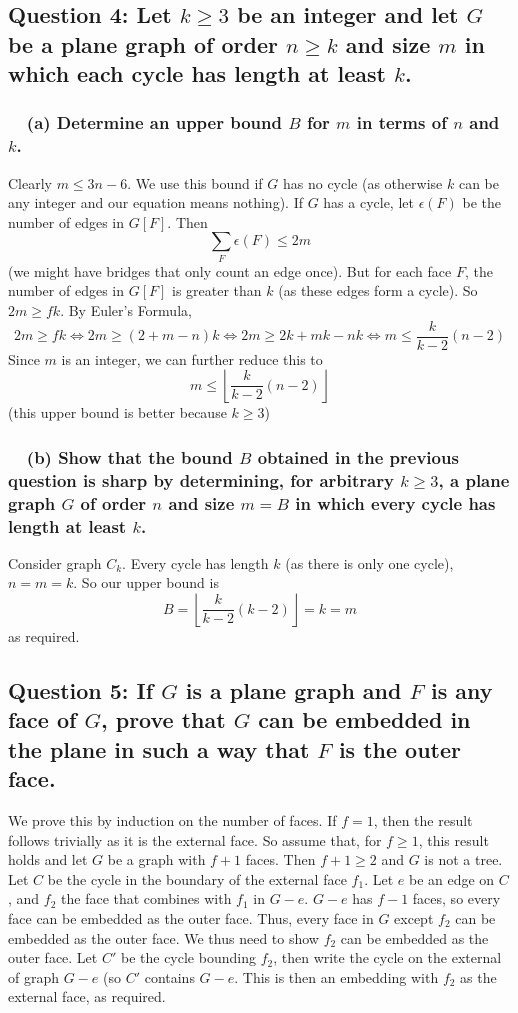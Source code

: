 \documentclass[letterpaper, 11pt]{article}
\newcommand{\1}{\mathds{1}}	%
\theoremstyle{definition}
\begin{document}
\subsection*{Question 4: Let $k \ge 3$ be an integer and let $G$ be a plane graph of order $n \ge k$ and size $m$ in which each cycle has length at least $k$.}

\subsubsection*{\ \ (a) Determine an upper bound $B$ for $m$ in terms of $n$ and $k$.}
Clearly $m \le 3n-6$. We use this bound if $G$ has no cycle (as otherwise $k$ can be any integer and our equation means nothing). If $G$ has a cycle, let $\epsilon (F)$ be the number of edges in $G[F]$. Then\[
\sum _F \epsilon (F) \le 2m
\]
(we might have bridges that only count an edge once). But for each face $F$, the number of edges in $G[F]$ is greater than $k$ (as these edges form a cycle). So $2m \ge fk$. By Euler's Formula, \[
2m \ge fk \iff 2m \ge (2 + m - n)k \iff 2m \ge 2k + mk - nk \iff m \le \frac{k}{k-2} (n-2)
\]
Since $m$ is an integer, we can further reduce this to \[
m \le \left \lfloor \frac{k}{k-2} (n-2) \right \rfloor
\]
(this upper bound is better because $k \ge 3$)
\subsubsection*{\ \ (b) Show that the bound $B$ obtained in the previous question is sharp by determining, for arbitrary $k \ge 3$, a plane graph $G$ of order $n$ and size $m = B$ in which every cycle has length at least $k$.}

Consider graph $C_k$. Every cycle has length $k$ (as there is only one cycle), $n = m = k$. So our upper bound is \[
B = \left \lfloor \frac{k}{k-2}(k-2) \right \rfloor = k = m
\]
as required.

\subsection*{Question 5: If $G$ is a plane graph and $F$ is any face of $G$, prove that $G$ can be embedded in the plane in such a way that $F$ is the outer face.}
We prove this by induction on the number of faces. If $f=1$, then the result follows trivially as it is the external face. So assume that, for $f \ge 1$, this result holds and let $G$ be a graph with $f+1$ faces. Then $f+1 \ge 2$ and $G$ is not a tree. Let $C$ be the cycle in the boundary of the external face $f_1$. Let $e$ be an edge on $C$, and $f_2$ the face that combines with $f_1$ in $G - e$. $G-e$ has $f-1$ faces, so every face can be embedded as the outer face. Thus, every face in $G$ except $f_2$ can be embedded as the outer face. We thus need to show $f_2$ can be embedded as the outer face. Let $C'$ be the cycle bounding $f_2$, then write the cycle on the external of graph $G-e$ (so $C'$ contains $G-e$. This is then an embedding with $f_2$ as the external face, as required.
\end{document}
